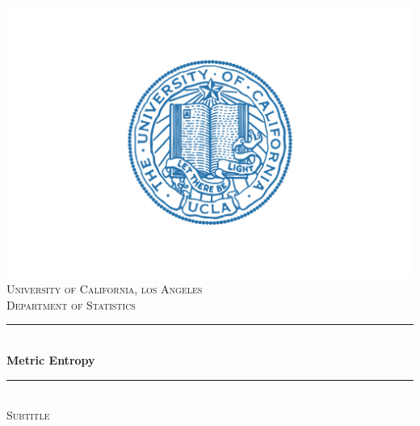 \documentclass[12pt, twoside]{article}
\newcommand{\1}{\mathbb{1}}
\begin{document}
\begin{titlepage}

    \newcommand{\HRule}{\rule{\linewidth}{0.5mm}} %

    \center %
 
    \includegraphics[scale = 0.22]{campus-seal.jpg}\\[0.5cm]
    
     \textsc{\large University of California, los Angeles}\\[0.2cm] %
     \textsc{\large Department of Statistics}\\[0.5cm]

    \HRule \\[0.4cm]
    { \huge \bfseries Metric Entropy}\\[0.2cm] %
    \HRule \\[0.4cm]
    \textsc{\large Subtitle}\\[2.0 cm]
 
    

\end{titlepage}
\end{document}
